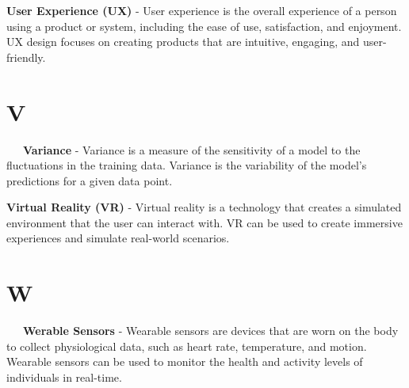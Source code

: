 \textbf{User Experience (UX)} - User experience is the overall experience of a person using a product or system, including the ease of use, satisfaction, and enjoyment. UX design focuses on creating products that are intuitive, engaging, and user-friendly.

\section*{V}

\-\ \-\ \-\ \textbf{Variance} - Variance is a measure of the sensitivity of a model to the fluctuations in the training data. Variance is the variability of the model's predictions for a given data point.

\textbf{Virtual Reality (VR)} - Virtual reality is a technology that creates a simulated environment that the user can interact with. VR can be used to create immersive experiences and simulate real-world scenarios.

\section*{W}

\-\ \-\ \-\ \textbf{Werable Sensors} - Wearable sensors are devices that are worn on the body to collect physiological data, such as heart rate, temperature, and motion. Wearable sensors can be used to monitor the health and activity levels of individuals in real-time.
